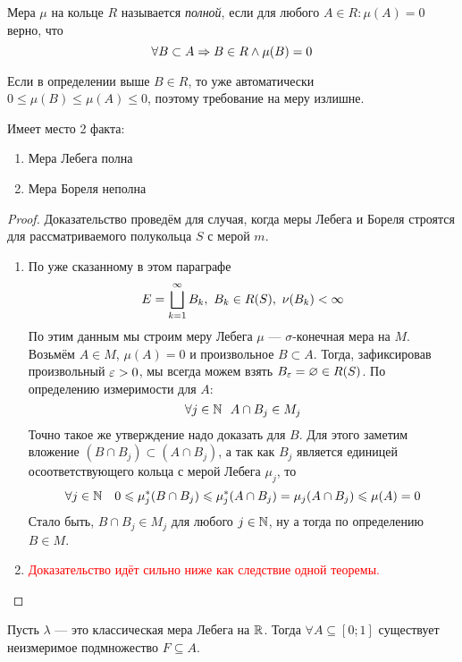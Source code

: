 \begin{definition}
	Мера $\mu$ на кольце $R$ называется \textit{полной}, если для любого $A \in R \colon \mu(A) = 0$ верно, что
	\[
		\forall B \subset A \Rightarrow B \in R \wedge \mu(B) = 0
	\]
\end{definition}

\begin{note}
	Если в определении выше $B \in R$, то уже автоматически $0 \le \mu(B) \le \mu(A) \le 0$, поэтому требование на меру излишне.
\end{note}

\begin{proposition}
	Имеет место 2 факта:
	\begin{enumerate}
		\item Мера Лебега полна
		
		\item Мера Бореля неполна
	\end{enumerate}
\end{proposition}

\begin{proof}
	Доказательство проведём для случая, когда меры Лебега и Бореля строятся для рассматриваемого полукольца $S$ с мерой $m$.
	\begin{enumerate}
		\item По уже сказанному в этом параграфе
		\[
			E = \bigsqcup_{k = 1}^\infty B_k,\ B_k \in R(S),\ \nu(B_k) < \infty
		\]
		По этим данным мы строим меру Лебега $\mu$ --- $\sigma$-конечная мера на $M$. Возьмём $A \in M$, $\mu(A) = 0$ и произвольное $B \subset A$. Тогда, зафиксировав произвольный $\varepsilon > 0$, мы всегда можем взять $B_{\varepsilon} = \varnothing \in R(S)$. По определению измеримости для $A$:
		\[
			\forall j \in \mathbb{N}\ \ A \cap B_j \in M_j
		\]
		Точно такое же утверждение надо доказать для $B$. Для этого заметим вложение $(B \cap B_j) \subset (A \cap B_j)$, а так как $B_j$ является единицей осоответствующего кольца с мерой Лебега $\mu_j$, то
		\[
			\forall j \in \mathbb{N} \quad 0 \leqslant \mu_j^*(B \cap B_j) \leqslant \mu_j^*(A \cap B_j) = \mu_j(A \cap B_j) \leqslant \mu(A) = 0
		\]
		Стало быть, $B \cap B_j \in M_j$ для любого $j \in \mathbb{N}$, ну а тогда по определению $B \in M$.
		
		\item \textcolor{red}{Доказательство идёт сильно ниже как следствие одной теоремы.}
	\end{enumerate}
\end{proof}

\begin{reminder}
	Пусть $\lambda$ --- это классическая мера Лебега на $\mathbb{R}$. Тогда $\forall A \subseteq [0; 1]$ существует неизмеримое подмножество $F \subseteq A$.
\end{reminder}

